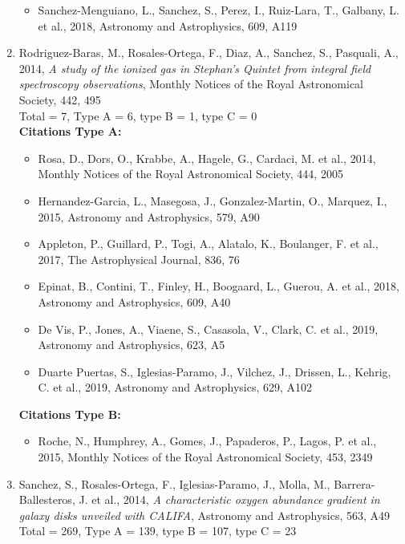\documentclass{letter}
\begin{document}
\begin{enumerate}
\begin{itemize}
\item Sanchez-Menguiano, L., Sanchez, S., Perez, I., Ruiz-Lara, T., Galbany, L. et al., 2018, Astronomy and Astrophysics, 609, A119
\end{itemize}
\item Rodriguez-Baras, M., Rosales-Ortega, F., Diaz, A., Sanchez, S., Pasquali, A., 2014, {\it A study of the ionized gas in Stephan's Quintet from integral field spectroscopy observations}, Monthly Notices of the Royal Astronomical Society, 442, 495 \\ 
Total = 7, Type A = 6, type B = 1, type C = 0 \\ 
{\bf Citations Type A:}
\begin{itemize}
\item Rosa, D., Dors, O., Krabbe, A., Hagele, G., Cardaci, M. et al., 2014, Monthly Notices of the Royal Astronomical Society, 444, 2005
\item Hernandez-Garcia, L., Masegosa, J., Gonzalez-Martin, O., Marquez, I., 2015, Astronomy and Astrophysics, 579, A90
\item Appleton, P., Guillard, P., Togi, A., Alatalo, K., Boulanger, F. et al., 2017, The Astrophysical Journal, 836, 76
\item Epinat, B., Contini, T., Finley, H., Boogaard, L., Guerou, A. et al., 2018, Astronomy and Astrophysics, 609, A40
\item De Vis, P., Jones, A., Viaene, S., Casasola, V., Clark, C. et al., 2019, Astronomy and Astrophysics, 623, A5
\item Duarte Puertas, S., Iglesias-Paramo, J., Vilchez, J., Drissen, L., Kehrig, C. et al., 2019, Astronomy and Astrophysics, 629, A102
\end{itemize}
{\bf Citations Type B:}
\begin{itemize}
\item Roche, N., Humphrey, A., Gomes, J., Papaderos, P., Lagos, P. et al., 2015, Monthly Notices of the Royal Astronomical Society, 453, 2349
\end{itemize}
\item Sanchez, S., Rosales-Ortega, F., Iglesias-Paramo, J., Molla, M., Barrera-Ballesteros, J. et al., 2014, {\it A characteristic oxygen abundance gradient in galaxy disks unveiled with CALIFA}, Astronomy and Astrophysics, 563, A49 \\ 
Total = 269, Type A = 139, type B = 107, type C = 23 \\ 

\end{enumerate}
\end{document}
